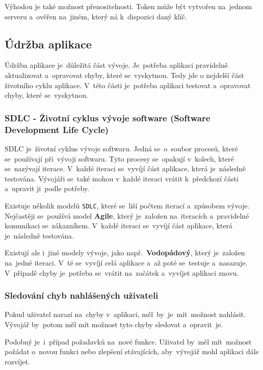\documentclass[14pt,a4paper]{article}
\begin{document}
            Výhodou je také možnost přenositelnosti. Token může být vytvořen na~jednom serveru a~ověřen na~jiném, který ná k~dispozici daný klíč.\parencite{ieee:jwt}

        \subsection{Údržba aplikace}
        Údržba aplikace je~důležitá část vývoje. Je~potřeba aplikaci pravidelně aktualizovat a~opravovat chyby, které se~vyskytnou.
        Tedy jde o nejdelší část životního cyklu aplikace. V~této části je~potřeba aplikaci testovat a~opravovat chyby, které se~vyskytnou.
        
            \subsubsection{SDLC - Životní cyklus vývoje software (Software Development Life Cycle)}
            SDLC je~životní cyklus vývoje softwaru. Jedná se~o~soubor procesů, které se~používají při~vývoji softwaru.
            Tyto procesy se~opakují v~kolech, které se~nazývají iterace. V~každé iteraci se~vyvíjí část aplikace, která je~následně testována.
            Vývojáři se~také mohou v~každé iteraci vrátit k~předchozí části a~upravit ji~podle potřeby.

            Existuje několik modelů \texttt{SDLC}, které se~liší počtem iterací a~způsobem vývoje. Nejčastěji se~používá model \textbf{Agile},
            který je~založen na~iteracích a~pravidelné komunikaci se~zákazníkem. V~každé iteraci se~vyvíjí část aplikace, která je~následně testována.

            Existují ale i~jiné modely vývoje, jako např.~\textbf{Vodopádový}, který je~založen na~jedné iteraci.
            V~té se~vyvíjí celá aplikace a~až poté se~testuje a~nasazuje.
            V~případě chyby je~potřeba se~vrátit na~začátek a~vyvíjet aplikaci znovu.

            \subsubsection{Sledování chyb nahlášených uživateli}
            Pokud uživatel narazí na~chyby v~aplikaci, měl~by~je~mít~možnost nahlásit. Vývojář by~potom měl mít možnost tyto chyby sledovat a~opravit~je.

            Podobný je~i~případ požadavků na~nové funkce. Uživatel by~měl mít~možnost požádat o~novou funkci nebo zlepšení stávajících,
            aby~vývojář mohl aplikaci dále rozvíjet.
\end{document}
